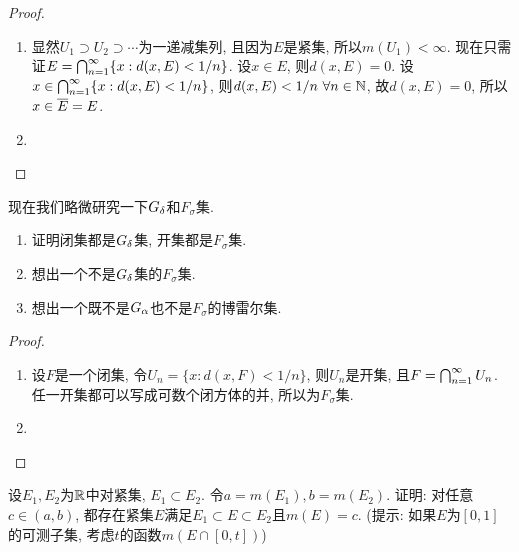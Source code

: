 \begin{proof}
    \begin{enumerate}
    \item 显然$U_1 \supset U_2 \supset \cdots$为一递减集列, 且因为$E$是紧集, 所以$m(U_1) < \infty$. 
    现在只需证$E = \bigcap_{n=1}^{\infty}\{x:d(x,E) < 1/n\}$. 设$x \in E$, 则$d(x,E)=0$. 设$x \in  \bigcap_{n=1}^{\infty}\{x:d(x,E) < 1/n\}$, 则$d(x,E) < 1/n~\forall n \in \mathbb{N}$, 故$d(x,E) = 0$, 所以$x \in \overline{E} = E$. 
    \item 
    \end{enumerate}
\end{proof}

现在我们略微研究一下$G_\delta$和$F_\sigma$集.
\begin{exercise}
    \begin{enumerate}
    \item 证明闭集都是$G_\delta$集, 开集都是$F_\sigma$集.
    \item 想出一个不是$G_\delta$集的$F_\sigma$集.
    \item 想出一个既不是$G_\alpha$也不是$F_\sigma$的博雷尔集. 
    \end{enumerate}
\end{exercise}
\begin{proof}
    \begin{enumerate}
    \item 设$F$是一个闭集, 令$U_n = \{x: d(x,F) < 1/n\}$, 则$U_n$是开集, 且$F = \bigcap_{n=1}^{\infty}U_n$. 任一开集都可以写成可数个闭方体的并, 所以为$F_\sigma$集. 
    \item 
    \end{enumerate}
\end{proof}
\begin{exercise} %
    设$E_1,E_2$为$\mathbb{R}$中对紧集, $E_1 \subset E_2$. 令$a = m(E_1), b = m(E_2)$. 
    证明: 对任意$c \in (a,b)$, 都存在紧集$E$满足$E_1 \subset E \subset E_2$且$m(E)=c$. 
    (提示: 如果$E$为$[0,1]$的可测子集, 考虑$t$的函数$m(E \cap [0,t])$)
\end{exercise}
